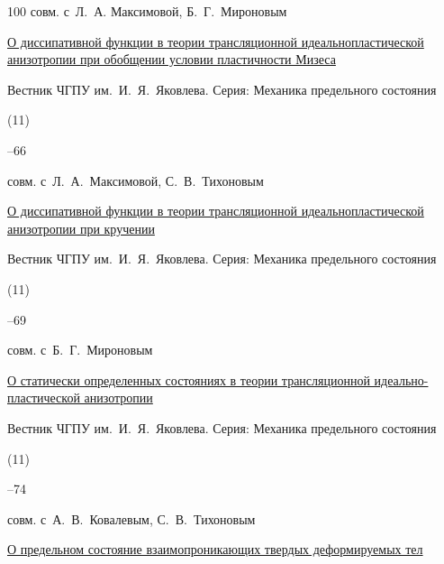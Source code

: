 \begin{thebibliography}{100}
\miscnote совм. с~Л.~А. Максимовой, Б.~Г.~Мироновым





\paper \href{http://elibrary.ru/item.asp?id=17772051}{О диссипативной функции в теории трансляционной идеальнопластической анизотропии при обобщении условии пластичности Мизеса} 

\jour Вестник ЧГПУ им.~И.~Я.~Яковлева. Серия: Механика предельного состояния


(11)

–66 

\miscnote совм. с~Л.~А.~Максимовой, С.~В.~Тихоновым





\paper \href{http://elibrary.ru/item.asp?id=17772049}{О диссипативной функции в теории трансляционной идеальнопластической анизотропии при кручении}

\jour Вестник ЧГПУ им.~И.~Я.~Яковлева. Серия: Механика предельного состояния


(11)

–69 

\miscnote совм. с~Б.~Г.~Мироновым





\paper \href{http://elibrary.ru/item.asp?id=17772052}{О статически определенных состояниях в теории трансляционной идеально-пластической анизотропии}

\jour Вестник ЧГПУ им.~И.~Я.~Яковлева. Серия: Механика предельного состояния


(11)

–74 

\miscnote совм. с~А.~В.~Ковалевым, С.~В.~Тихоновым





\paper \href{http://elibrary.ru/item.asp?id=18347091}{О предельном состояние взаимопроникающих твердых деформируемых тел}


\end{thebibliography}
